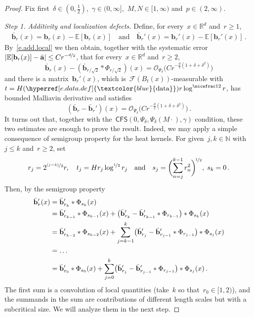 \documentclass[11pt,twoside]{article} %
\numberwithin{equation}{section}
\theoremstyle{definition}
\newcommand{\dataref}{\hyperref[e.data.def]{\textcolor{blue}{\ensuremath{\mathrm{data}}}}}
\newcommand*{\N}{\ensuremath{\mathbb{N}}}
\newcommand*{\R}{\ensuremath{\mathbb{R}}}
\renewcommand{\b}{\ensuremath{\mathbf{b}}}
\newcommand{\qand}{\quad \mbox{and} \quad }
\renewcommand{\a}{\mathbf{a}}
\newcommand{\ahom}{\bar{\a}}
\newcommand{\bhom}{\bar{\mathbf{b}}}
\newcommand{\E}{\mathbb{E}}
\renewcommand{\O}{\mathcal{O}}
\newcommand{\CFS}{\mathsf{CFS}}
\begin{document}
\begin{proof}
Fix first~$\delta \in (0,\frac12)$,~$\gamma \in (0,\infty]$,~$M,N \in [1,\infty)$ and~$p \in (2,\infty)$.  

\smallskip 

\emph{Step 1. Additivity and localization defects.} 
Define, for every~$x \in \R^d$ and~$r \geq 1$, 
\begin{align*}  
\bhom_{r}(x) = \b_{r}(x) -  \E[\b_{r}(x)] \qand  \bhom_{r}'(x) = \b_{r}'(x) -  \E[\b_{r}'(x)] 
\,.
\end{align*}
By~\eqref{e.add.local} we then obtain, together with the systematic error~$|\E[\b_{r}(x)] - \ahom| \leq C r^{-\nicefrac d2}$, that   for every~$x \in \R^d$ and~$r \geq 2$,
\begin{equation} \label{e.betazero.add}
 \bhom_{r}(x) -  (\bhom_{r/\sqrt 2}  \ast \Phi_{r/\sqrt 2})(x)   = \O_{\Psi_\delta}  \bigl(C r^{-\frac{d}{2}(1+\delta + \delta^2)} \bigr) 
\end{equation}
and there is a matrix~$\b_r'(x)$, which is~$\mathcal{F}(B_{t}(x))$-measurable with~$t = H(\dataref) r \log^{\nicefrac 12} r$, has bounded Malliavin derivative and satisfies
\begin{equation}  \label{e.betazero.local}
(\bhom_{r} - \bhom_{r}')(x) = \O_{\Psi_\delta}  \bigl(C r^{-\frac{d}{2}(1+\delta+ \delta^2)} \bigr) 
\,.
\end{equation}
It turns out that, together with the~$\CFS(0,\Psi_\delta,\Psi_\delta(M\cdot),\gamma)$ condition, these two estimates are enough to prove the result. Indeed, we may apply a simple consequence of semigroup property for the heat kernels. For given~$j,k \in \N$ with~$j \leq k$ and~$r \geq 2$, set
\begin{equation*}  
r_j = 2^{\nicefrac {(j{-}k)}2} r , \quad t_j = H r_j \log^{\nicefrac12} r_j
\qand
s_j = \biggl( \sum_{n=j}^{k-1} r_n^2 \biggr)^{\!\nicefrac12}, \; s_k = 0
\,.
\end{equation*}
Then, by the semigroup property 
\begin{align}  \label{e.scalinglimit.id}
\notag
\bhom_{r}' (x)  
& = 
\bhom_{r_{k}}'  \ast \Phi_{s_{k}}(x) 
\\ \notag
& = 
\bhom_{r_{k-1}}'  \ast \Phi_{s_{k-1}}(x) 
+
\bigl(  \bhom_{r_{k}}' - \bhom_{r_{k-1}}' \ast \Phi_{r_{k-1}} \bigr) \ast \Phi_{s_{k}}(x) 
\\ \notag 
& = 
\bhom_{r_{k-2}}'  \ast \Phi_{s_{k-2} }(x) 
+  \sum_{j=k-1}^{k} \bigl(  \bhom_{r_j}' - \bhom_{r_{j-1}}' \ast \Phi_{r_{j-1}} \bigr) \ast \Phi_{s_j}(x)
\\ \notag
& =  \ldots 
\\ 
& = 
\bhom_{r_{0}}'  \ast \Phi_{s_{0}}(x)  
+ \sum_{j=0}^{k} \bigl(  \bhom_{r_j}' - \bhom_{r_{j-1}}' \ast \Phi_{r_{j-1}} \bigr) \ast \Phi_{s_j}(x)
\,.
\end{align}
The first sum is a convolution of local quantities (take~$k$ so that~$r_0 \in [1,2)$), and the summands in the sum are contributions of different length scales but with a subcritical size. We will analyze them in the next step. 






\end{proof}
\end{document}
